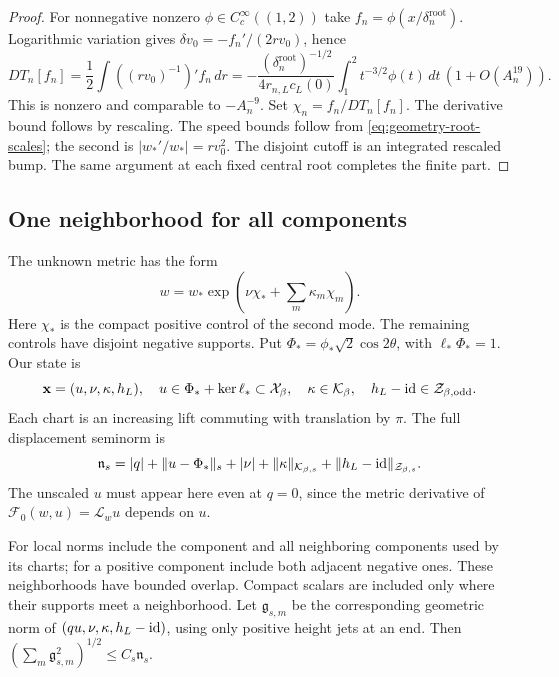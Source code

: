 \begin{proof}
For nonnegative nonzero $\phi\in C_c^\infty((1,2))$ take
$f_n=\phi(x/\delta_n^{\mathrm{root}})$. Logarithmic variation gives
$\delta v_0=-f_n'/(2rv_0)$, hence
\[
 DT_n[f_n]=\frac12\int((rv_0)^{-1})'f_n\,dr
 =-\frac{(\delta_n^{\mathrm{root}})^{-1/2}}{4r_{n,L}c_L(0)}
       \int_1^2t^{-3/2}\phi(t)\,dt\,(1+O(A_n^{19})).
\]
This is nonzero and comparable to $-A_n^{-9}$.
Set $\chi_n=f_n/DT_n[f_n]$. The derivative bound follows by rescaling.
The speed bounds follow from \eqref{eq:geometry-root-scales}; the
second is $|w_*'/w_*|=rv_0^2$. The disjoint cutoff is an integrated
rescaled bump. The same argument at each fixed central root completes
the finite part.
\end{proof}

\subsection{One neighborhood for all components}

The unknown metric has the form
\begin{equation}\label{eq:full-height-metric-controls}
 w=w_*\exp\left(\nu\chi_*+\sum_m\kappa_m\chi_m\right).
\end{equation}
Here $\chi_*$ is the compact positive control of the second mode.
The remaining controls have disjoint negative supports. Put
$\Phi_*=\phi_*\sqrt2\cos2\theta$, with $\ell_*\Phi_*=1$.
Our state is
\begin{equation}\label{eq:rewrite-state}
 \mathbf x=(u,\nu,\kappa,h_L),\quad
 u\in\Phi_*+\ker\ell_*\subset\mathcal X_\beta,\quad
 \kappa\in\mathcal K_\beta,\quad
 h_L-\mathrm{id}\in\mathcal Z_{\beta,\mathrm{odd}}.
\end{equation}
Each chart is an increasing lift commuting with translation by $\pi$.
The full displacement seminorm is
\begin{equation}\label{def:joint-displacement-seminorms}
 \mathfrak n_s=|q|+\|u-\Phi_*\|_s+|\nu|
           +\|\kappa\|_{\mathcal K_{\beta,s}}
           +\|h_L-\mathrm{id}\|_{\mathcal Z_{\beta,s}}.
\end{equation}
The unscaled $u$ must appear here even at $q=0$, since the metric
derivative of $\mathcal F_0(w,u)=\mathscr L_wu$ depends on $u$.

For local norms include the component and all neighboring components
used by its charts; for a positive component include both adjacent
negative ones. These neighborhoods have bounded overlap. Compact
scalars are included only where their supports meet a neighborhood.
Let $\mathfrak g_{s,m}$ be the corresponding geometric norm of
$(qu,\nu,\kappa,h_L-\mathrm{id})$, using only positive height jets at an end.
Then $(\sum_m\mathfrak g_{s,m}^2)^{1/2}\le C_s\mathfrak n_s$.

